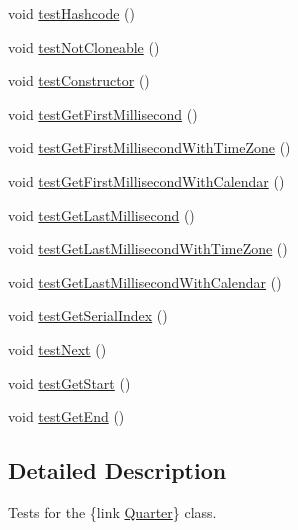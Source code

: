 \begin{DoxyCompactItemize}
\item 
void \mbox{\hyperlink{classorg_1_1jfree_1_1data_1_1time_1_1_quarter_test_a4832f99df1fa8ac057ff1d963199e804}{test\+Hashcode}} ()
\item 
void \mbox{\hyperlink{classorg_1_1jfree_1_1data_1_1time_1_1_quarter_test_ad1e946ea57c1e5118593926e530c4ffa}{test\+Not\+Cloneable}} ()
\item 
void \mbox{\hyperlink{classorg_1_1jfree_1_1data_1_1time_1_1_quarter_test_a651cbca37eee123bc5a103f4748682c8}{test\+Constructor}} ()
\item 
void \mbox{\hyperlink{classorg_1_1jfree_1_1data_1_1time_1_1_quarter_test_a638706631a178cd44a4ae3dc1890371a}{test\+Get\+First\+Millisecond}} ()
\item 
void \mbox{\hyperlink{classorg_1_1jfree_1_1data_1_1time_1_1_quarter_test_acba7c9e37e5d0ce9cef719b3044cf13f}{test\+Get\+First\+Millisecond\+With\+Time\+Zone}} ()
\item 
void \mbox{\hyperlink{classorg_1_1jfree_1_1data_1_1time_1_1_quarter_test_a79588fb286102b4f8472431d398e0e8a}{test\+Get\+First\+Millisecond\+With\+Calendar}} ()
\item 
void \mbox{\hyperlink{classorg_1_1jfree_1_1data_1_1time_1_1_quarter_test_af4fbc902fdcc28d79e8a63fceb3f448c}{test\+Get\+Last\+Millisecond}} ()
\item 
void \mbox{\hyperlink{classorg_1_1jfree_1_1data_1_1time_1_1_quarter_test_a176779d15698063f8b79db36819c0257}{test\+Get\+Last\+Millisecond\+With\+Time\+Zone}} ()
\item 
void \mbox{\hyperlink{classorg_1_1jfree_1_1data_1_1time_1_1_quarter_test_a40e9a7ee7db9ce9afb1a0545e843e779}{test\+Get\+Last\+Millisecond\+With\+Calendar}} ()
\item 
void \mbox{\hyperlink{classorg_1_1jfree_1_1data_1_1time_1_1_quarter_test_affcb204c464b215e3b3ff1bcc03424d0}{test\+Get\+Serial\+Index}} ()
\item 
void \mbox{\hyperlink{classorg_1_1jfree_1_1data_1_1time_1_1_quarter_test_af196f3c7f79433bcc7fce0756b626448}{test\+Next}} ()
\item 
void \mbox{\hyperlink{classorg_1_1jfree_1_1data_1_1time_1_1_quarter_test_a5575b7618862c2c3299ac9577ec1632d}{test\+Get\+Start}} ()
\item 
void \mbox{\hyperlink{classorg_1_1jfree_1_1data_1_1time_1_1_quarter_test_afa675ce8568f23b1c53ae7da56ebdd72}{test\+Get\+End}} ()
\end{DoxyCompactItemize}


\subsection{Detailed Description}
Tests for the \{link \mbox{\hyperlink{classorg_1_1jfree_1_1data_1_1time_1_1_quarter}{Quarter}}\} class. 

